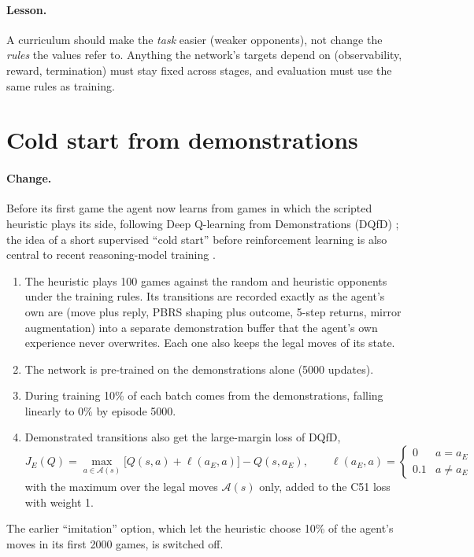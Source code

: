 \paragraph{Lesson.} A curriculum should make the \emph{task} easier (weaker opponents), not
change the \emph{rules} the values refer to. Anything the network's targets depend on
(observability, reward, termination) must stay fixed across stages, and evaluation must use the
same rules as training.

\section{Cold start from demonstrations}

\paragraph{Change.} Before its first game the agent now learns from games in which the scripted
heuristic plays its side, following Deep Q-learning from Demonstrations (DQfD) \cite{DQfD}; the
idea of a short supervised ``cold start'' before reinforcement learning is also central to recent
reasoning-model training \cite{DeepSeekR1}.
\begin{enumerate}
  \item The heuristic plays 100 games against the random and heuristic opponents under the
        training rules. Its transitions are recorded exactly as the agent's own are (move plus
        reply, PBRS shaping plus outcome, 5-step returns, mirror augmentation) into a separate
        demonstration buffer that the agent's own experience never overwrites. Each one also
        keeps the legal moves of its state.
  \item The network is pre-trained on the demonstrations alone (5000 updates).
  \item During training 10\% of each batch comes from the demonstrations, falling linearly to
        0\% by episode 5000.
  \item Demonstrated transitions also get the large-margin loss of DQfD,
        \[
          J_E(Q) = \max_{a \in \mathcal{A}(s)} \bigl[ Q(s,a) + \ell(a_E, a) \bigr] - Q(s, a_E),
          \qquad \ell(a_E, a) = \begin{cases} 0 & a = a_E \\ 0.1 & a \neq a_E \end{cases}
        \]
        with the maximum over the legal moves $\mathcal{A}(s)$ only, added to the C51 loss with
        weight 1.
\end{enumerate}
The earlier ``imitation'' option, which let the heuristic choose 10\% of the agent's moves in
its first 2000 games, is switched off.

